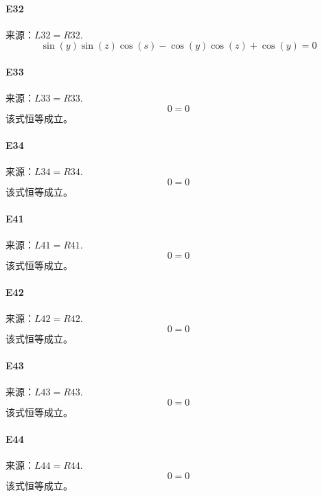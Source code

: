 \paragraph{E32} 来源：$L32 = R32$.
\[
\sin{\left(y \right)} \sin{\left(z \right)} \cos{\left(s \right)} - \cos{\left(y \right)} \cos{\left(z \right)} + \cos{\left(y \right)} = 0
\]

\paragraph{E33} 来源：$L33 = R33$.
\[
0 = 0
\]
该式恒等成立。

\paragraph{E34} 来源：$L34 = R34$.
\[
0 = 0
\]
该式恒等成立。

\paragraph{E41} 来源：$L41 = R41$.
\[
0 = 0
\]
该式恒等成立。

\paragraph{E42} 来源：$L42 = R42$.
\[
0 = 0
\]
该式恒等成立。

\paragraph{E43} 来源：$L43 = R43$.
\[
0 = 0
\]
该式恒等成立。

\paragraph{E44} 来源：$L44 = R44$.
\[
0 = 0
\]
该式恒等成立。
